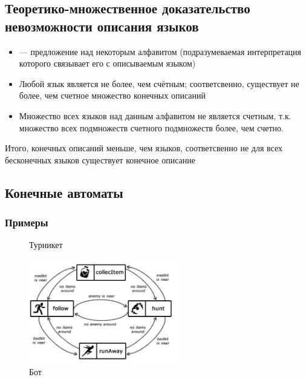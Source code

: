 \documentclass[a4paper, 14pt]{extarticle}
\begin{document}
\subsection{Теоретико-множественное доказательство невозможности описания языков}
\begin{itemize}
    \item {} --- предложение над некоторым алфавитом (подразумеваемая интерпретация которого связывает его с описываемым языком)

    \item Любой язык является не более, чем счётным; соответсвенно, существует не более, чем счетное множество конечных описаний

    \item Множество всех языков над данным алфавитом не является счетным, т.к. множество всех подмножеств счетного подмножеств более, чем счетно.

\end{itemize}
Итого, конечных описаний меньше, чем языков, соответсвенно не для всех бесконечных языков существует конечное описание

\subsection{Конечные автоматы}
\subsubsection*{Примеры}
\begin{figure}[h]
   \centering
   \caption{Турникет}
\end{figure}

\begin{figure}[h]
    \centering
    \includegraphics[width=0.6\textwidth]{./img/L2/S002.jpg}
    \caption{Бот}
\end{figure}
\end{document}

